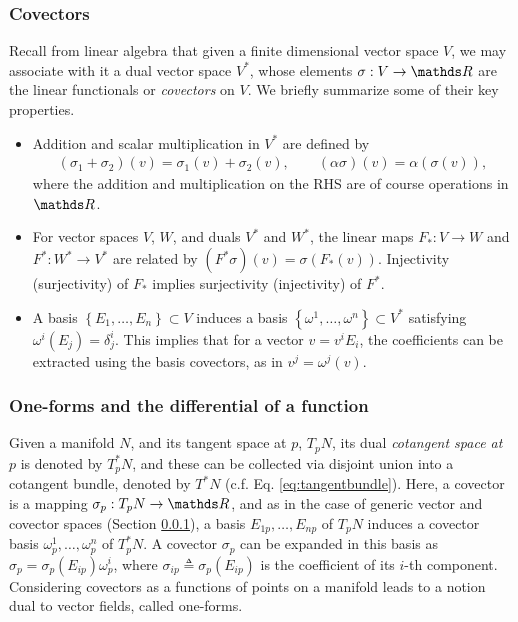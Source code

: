 \subsubsection{Covectors}\label{sec:covectors}

Recall from linear algebra that given a finite dimensional vector space $V$, we may associate with it a dual vector space $V^*$, whose elements $\sigma : V \rightarrow \R$ are the linear functionals or \textit{covectors} on $V$. We briefly summarize some of their key properties. 

\begin{itemize}
    \item Addition and scalar multiplication in $V^*$ are defined by
\begin{equation*}
\begin{aligned}
\left( \sigma_1 + \sigma_2 \right)(v) = \sigma_1(v)+\sigma_2(v), \qquad (\alpha \sigma) (v) = \alpha \left(\sigma(v)\right), 
\end{aligned}
\end{equation*}
where the addition and multiplication on the RHS are of course operations in $\R$. 
    \item For vector spaces $V$, $W$, and duals $V^*$ and $W^*$, the linear maps $F_*:V\rightarrow W$ and $F^*:W^*\rightarrow V^*$ are related by $(F^*\sigma)(v) = \sigma (F_*(v))$. Injectivity (surjectivity) of $F_*$ implies surjectivity (injectivity) of $F^*$. %
    \item A basis $\left\{E_1, \dots, E_n\right\} \subset V$ induces a basis $\left\{\omega^1, \dots, \omega^n\right\} \subset V^*$ satisfying $\omega^i(E_j) = \delta^i_j$. This implies that for a vector $v = v^i E_i$, the coefficients can be extracted using the basis covectors, as in $v^j = \omega^j(v)$. 
\end{itemize}

\subsubsection{One-forms and the differential of a function}

Given a manifold $N$, and its tangent space at $p$, $T_pN $, its dual \textit{cotangent space at $p$} is denoted by $T^*_pN$, and these can be collected via disjoint union into a cotangent bundle, denoted by $T^*N$ (c.f. Eq. \ref{eq:tangentbundle}). Here, a covector is a mapping $\sigma_p : T_pN\rightarrow \R$, and as in the case of generic vector and covector spaces (Section \ref{sec:covectors}), a basis $E_{1p}, \dots, E_{np}$ of $T_pN$ induces a covector basis $\omega^1_p, \dots, \omega^n_p$ of $T^*_pN$. A covector $\sigma_p$ can be expanded in this basis as $\sigma_p = \sigma_p(E_{ip})\omega^i_p$, where $\sigma_{ip}\triangleq\sigma_p(E_{ip})$ is the coefficient of its $i$-th component. Considering covectors as a functions of points on a manifold leads to a notion dual to vector fields, called one-forms. 

